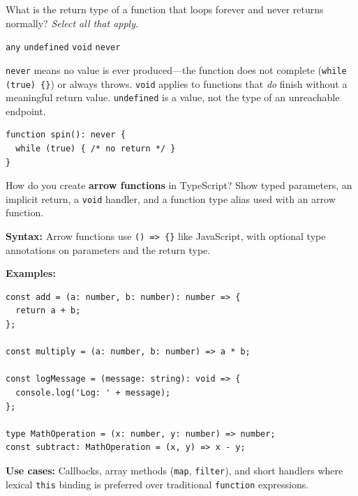 \newpage




\question[4]
What is the return type of a function that loops forever and never returns normally? \emph{Select all that apply.}
\begin{checkboxes}
  \choice \lstinline[style=tsinline]|any|
  \choice \lstinline[style=tsinline]|undefined|
  \choice \lstinline[style=tsinline]|void|
  \CorrectChoice \lstinline[style=tsinline]|never|
\end{checkboxes}
\begin{solution}
  \lstinline[style=tsinline]|never| means no value is ever produced---the function does not complete (\lstinline[style=tsinline]|while (true) {}|) or always throws. \lstinline[style=tsinline]|void| applies to functions that \emph{do} finish without a meaningful return value. \lstinline[style=tsinline]|undefined| is a value, not the type of an unreachable endpoint.
\begin{lstlisting}[style=ts]
function spin(): never {
  while (true) { /* no return */ }
}
\end{lstlisting}
\end{solution}

\question[6]
How do you create \textbf{arrow functions} in TypeScript? Show typed parameters, an implicit return, a \lstinline[style=tsinline]|void| handler, and a function type alias used with an arrow function.
\begin{solutionorbox}[4.75in]
\textbf{Syntax:} Arrow functions use \lstinline[style=tsinline]|() => {}| like JavaScript, with optional type annotations on parameters and the return type.

\textbf{Examples:}
\begin{lstlisting}[style=ts]
const add = (a: number, b: number): number => {
  return a + b;
};

const multiply = (a: number, b: number) => a * b;

const logMessage = (message: string): void => {
  console.log('Log: ' + message);
};

type MathOperation = (x: number, y: number) => number;
const subtract: MathOperation = (x, y) => x - y;
\end{lstlisting}

\textbf{Use cases:} Callbacks, array methods (\lstinline[style=tsinline]|map|, \lstinline[style=tsinline]|filter|), and short handlers where lexical \lstinline[style=tsinline]|this| binding is preferred over traditional \lstinline[style=tsinline]|function| expressions.
\end{solutionorbox}

